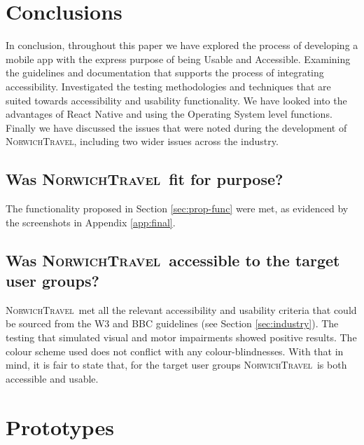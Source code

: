 \documentclass[cmpstyle]{ueacmpstyle}
\newcommand{\nt}{\textsc{NorwichTravel}}
\begin{document}
	\section{Conclusions} \label{sec:conc}
	In conclusion, throughout this paper we have explored the process of developing a mobile app with the express purpose of being Usable and Accessible. Examining the guidelines and documentation that supports the process of integrating accessibility. Investigated the testing methodologies and techniques that are suited towards accessibility and usability functionality. We have looked into the advantages of React Native and using the Operating System level functions. Finally we have discussed the issues that were noted during the development of \nt, including two wider issues across the industry.
	
		\subsection{Was \nt \ fit for purpose?} \label{sec:fit}
		The functionality proposed in Section \ref{sec:prop-func} were met, as evidenced by the screenshots in Appendix \ref{app:final}.
		
		\subsection{Was \nt \ accessible to the target user groups?} \label{sec:accessibletotarget}
		\nt \ met all the relevant accessibility and usability criteria that could be sourced from the W3 and BBC guidelines (see Section \ref{sec:industry}). The testing that simulated visual and motor impairments showed positive results. The colour scheme used does not conflict with any colour-blindnesses. With that in mind, it is fair to state that, for the target user groups \nt \ is both accessible and usable. 
		
	
	
	
	\clearpage
	\appendix
	\section{Prototypes} \label{app:proto}
\end{document}
